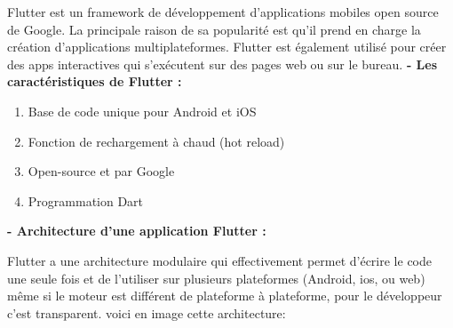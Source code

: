 Flutter est un framework de développement d’applications mobiles open source de Google. La principale raison de sa popularité est qu’il prend en charge la création 		   
d’applications multiplateformes. Flutter est également utilisé pour créer des apps interactives qui s’exécutent sur des pages web ou sur le bureau.\newline\newline
\textbf {- Les caractéristiques de Flutter :}
\begin{enumerate}
	\item Base de code unique pour Android et iOS
	\item Fonction de rechargement à chaud (hot reload)
	\item Open-source et par Google
	\item Programmation Dart \newline
\end{enumerate}
\textbf {- Architecture d’une application Flutter :} 

Flutter a une architecture modulaire qui effectivement permet d’écrire le code une seule fois et de l’utiliser sur plusieurs plateformes (Android, ios, ou web) même si le moteur est différent de plateforme à plateforme, pour le développeur c’est transparent. voici en image cette architecture:


